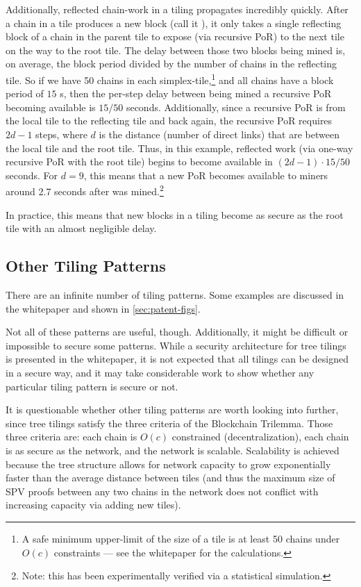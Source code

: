 \documentclass[a4paper,]{article}
\begin{document}
Additionally, reflected chain-work in a tiling propagates incredibly quickly.
After a chain in a tile produces a new block (call it ), it only takes a single reflecting block of a chain in the parent tile to expose (via recursive PoR)  to the next tile on the way to the root tile.
The delay between those two blocks being mined is, on average, the block period divided by the number of chains in the reflecting tile.
So if we have 50 chains in each simplex-tile,\footnote{
  A safe minimum upper-limit of the size of a tile is at least 50 chains under $O(c)$ constraints --- see the whitepaper for the calculations.
} and all chains have a block period of $15$ s, then the per-step delay between  being mined a recursive PoR becoming available is $15/50$ seconds.
Additionally, since a recursive PoR is from the local tile to the reflecting tile and back again, the recursive PoR requires $2d-1$ steps, where $d$ is the distance (number of direct links) that are between the local tile and the root tile.
Thus, in this example, reflected work (via one-way recursive PoR with the root tile) begins to become available in $(2d-1) \cdot 15/50$ seconds.
For $d = 9$, this means that a new PoR becomes available to \cL miners around 2.7 seconds after  was mined.\footnote{
  Note: this has been experimentally verified via a statistical simulation.
}

In practice, this means that new blocks in a tiling become as secure as the root tile with an almost negligible delay.

\subsection{Other Tiling Patterns}

There are an infinite number of tiling patterns.
Some examples are discussed in the whitepaper and shown in \autoref{sec:patent-figs}.

Not all of these patterns are useful, though.
Additionally, it might be difficult or impossible to secure some patterns.
While a security architecture for tree tilings is presented in the whitepaper, it is not expected that all tilings can be designed in a secure way, and it may take considerable work to show whether any particular tiling pattern is secure or not.

It is questionable whether other tiling patterns are worth looking into further, since tree tilings satisfy the three criteria of the Blockchain Trilemma.
Those three criteria are: each chain is $O(c)$ constrained (decentralization), each chain is as secure as the network, and the network is scalable.
Scalability is achieved because the tree structure allows for network capacity to grow exponentially faster than the average distance between tiles (and thus the maximum size of SPV proofs between any two chains in the network does not conflict with increasing capacity via adding new tiles).
\end{document}

